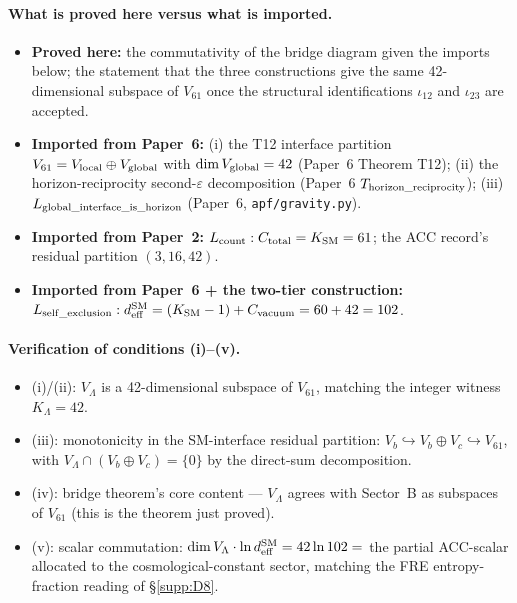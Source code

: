 \documentclass[11pt]{article}
\theoremstyle{plain}
\theoremstyle{definition}
\theoremstyle{remark}
\begin{document}
\paragraph{What is proved here versus what is imported.}
\begin{itemize}[leftmargin=2em,itemsep=2pt]
  \item \textbf{Proved here:} the commutativity of the bridge diagram given the imports below; the statement that the three constructions give the same 42-dimensional subspace of $V_{61}$ once the structural identifications $\iota_{12}$ and $\iota_{23}$ are accepted.
  \item \textbf{Imported from Paper~6:} (i) the T12 interface partition $V_{61} = V_{\rm local} \oplus V_{\rm global}$ with $\dim V_{\rm global} = 42$ (Paper~6 Theorem T12); (ii) the horizon-reciprocity second-$\varepsilon$ decomposition (Paper~6 $T_{\rm horizon\_reciprocity}$); (iii) $L_{\rm global\_interface\_is\_horizon}$ (Paper~6, \texttt{apf/gravity.py}).
  \item \textbf{Imported from Paper~2:} $L_{\rm count}: C_{\rm total} = K_{\rm SM} = 61$; the ACC record's residual partition $(3, 16, 42)$.
  \item \textbf{Imported from Paper~6 + the two-tier construction:} $L_{\rm self\_exclusion}: d_{\rm eff}^{\rm SM} = (K_{\rm SM} - 1) + C_{\rm vacuum} = 60 + 42 = 102$.
\end{itemize}

\paragraph{Verification of conditions (i)--(v).}
\begin{itemize}[leftmargin=2em,itemsep=2pt]
  \item (i)/(ii): $V_\Lambda$ is a 42-dimensional subspace of $V_{61}$, matching the integer witness $K_\Lambda = 42$.
  \item (iii): monotonicity in the SM-interface residual partition: $V_b \hookrightarrow V_b \oplus V_c \hookrightarrow V_{61}$, with $V_\Lambda \cap (V_b \oplus V_c) = \{0\}$ by the direct-sum decomposition.
  \item (iv): bridge theorem's core content --- $V_\Lambda$ agrees with Sector~B as subspaces of $V_{61}$ (this is the theorem just proved).
  \item (v): scalar commutation: $\dim V_\Lambda \cdot \ln d_{\rm eff}^{\rm SM} = 42 \ln 102 = $ the partial ACC-scalar allocated to the cosmological-constant sector, matching the FRE entropy-fraction reading of \S\ref{supp:D8}.
\end{itemize}
\end{document}

